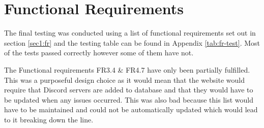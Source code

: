 \section{Functional Requirements}\label{sec4:fr}
The final testing was conducted using a list of functional requirements set out in section \ref{sec1:fr} and the testing table can be found in Appendix \ref{tab:fr-test}. Most of the tests passed correctly however some of them have not.

The Functional requirements FR3.4 \& FR4.7 have only been partially fulfilled. This was a purposeful design choice as it would mean that the website would require that Discord servers are added to database and that they would have to be updated when any issues occurred. This was also bad because this list would have to be maintained and could not be automatically updated which would lead to it breaking down the line.